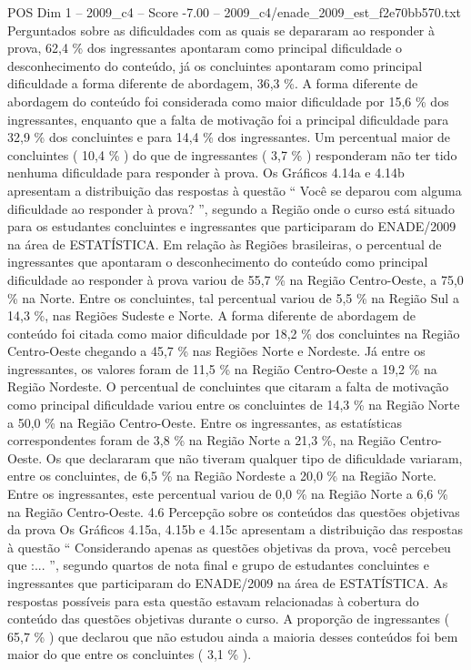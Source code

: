 \begin{textsample}{POS Dim 1 – 2009\_c4 – Score -7.00 – 2009\_c4/enade\_2009\_est\_f2e70bb570.txt}
Perguntados sobre as dificuldades com as quais se depararam ao responder à prova, 62,4 \% dos ingressantes apontaram como principal dificuldade o desconhecimento do conteúdo, já os concluintes apontaram como principal dificuldade a forma diferente de abordagem, 36,3 \%.
A forma diferente de abordagem do conteúdo foi considerada como maior dificuldade por 15,6 \% dos ingressantes, enquanto que a falta de motivação foi a principal dificuldade para 32,9 \% dos concluintes e para 14,4 \% dos ingressantes.
Um percentual maior de concluintes ( 10,4 \% ) do que de ingressantes ( 3,7 \% ) responderam não ter tido nenhuma dificuldade para responder à prova.
Os Gráficos 4.14a e 4.14b apresentam a distribuição das respostas à questão “ Você se deparou com alguma dificuldade ao responder à prova? ”, segundo a Região onde o curso está situado para os estudantes concluintes e ingressantes que participaram do ENADE/2009 na área de ESTATÍSTICA.
Em relação às Regiões brasileiras, o percentual de ingressantes que apontaram o desconhecimento do conteúdo como principal dificuldade ao responder à prova variou de 55,7 \% na Região Centro-Oeste, a 75,0 \% na Norte.
Entre os concluintes, tal percentual variou de 5,5 \% na Região Sul a 14,3 \%, nas Regiões Sudeste e Norte.
A forma diferente de abordagem de conteúdo foi citada como maior dificuldade por 18,2 \% dos concluintes na Região Centro-Oeste chegando a 45,7 \% nas Regiões Norte e Nordeste.
Já entre os ingressantes, os valores foram de 11,5 \% na Região Centro-Oeste a 19,2 \% na Região Nordeste.
O percentual de concluintes que citaram a falta de motivação como principal dificuldade variou entre os concluintes de 14,3 \% na Região Norte a 50,0 \% na Região Centro-Oeste.
Entre os ingressantes, as estatísticas correspondentes foram de 3,8 \% na Região Norte a 21,3 \%, na Região Centro-Oeste.
Os que declararam que não tiveram qualquer tipo de dificuldade variaram, entre os concluintes, de 6,5 \% na Região Nordeste a 20,0 \% na Região Norte.
Entre os ingressantes, este percentual variou de 0,0 \% na Região Norte a 6,6 \% na Região Centro-Oeste. 4.6 Percepção sobre os conteúdos das questões objetivas da prova Os Gráficos 4.15a, 4.15b e 4.15c apresentam a distribuição das respostas à questão “ Considerando apenas as questões objetivas da prova, você percebeu que :... ”, segundo quartos de nota final e grupo de estudantes concluintes e ingressantes que participaram do ENADE/2009 na área de ESTATÍSTICA.
As respostas possíveis para esta questão estavam relacionadas à cobertura do conteúdo das questões objetivas durante o curso.
A proporção de ingressantes ( 65,7 \% ) que declarou que não estudou ainda a maioria desses conteúdos foi bem maior do que entre os concluintes ( 3,1 \% ).

\end{textsample}
